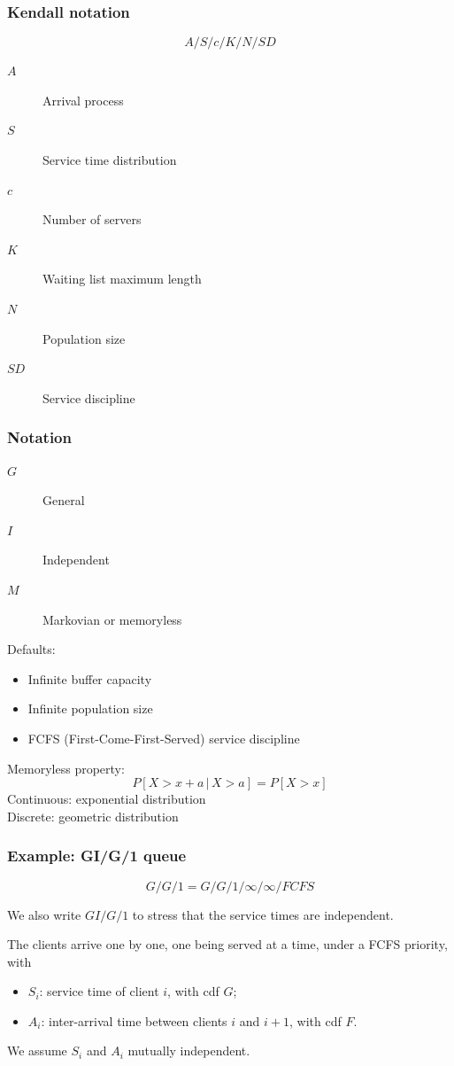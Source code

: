 \documentclass[t,usepdftitle=false]{beamer}
\begin{document}
\begin{frame}
\frametitle{Kendall notation}

$$
A/S/c/K/N/SD
$$

\mbox{}

\begin{description}
	\item[$A$]
Arrival process
	\item[$S$]
Service time distribution
	\item[$c$]
Number of servers
	\item[$K$]
Waiting list maximum length
	\item[$N$]
Population size
	\item[$SD$]
Service discipline
\end{description}
 
\end{frame}

\begin{frame}
\frametitle{Notation}

\begin{description}
	\item[$G$]
	General
	\item[$I$]
	Independent
	\item[$M$]
	Markovian or memoryless
\end{description}

\mbox{}

Defaults:
\begin{itemize}
	\item
	Infinite buffer capacity
	\item
	Infinite population size
	\item
	FCFS (First-Come-First-Served) service discipline
\end{itemize}

\mbox{}

Memoryless property:
$$
P[X > x +a \,|\, X > a] = P[X > x]
$$
Continuous: exponential distribution\\
Discrete: geometric distribution 

\end{frame}

\begin{frame}
\frametitle{Example: GI/G/1 queue}

$$
G/G/1 = G/G/1/\infty/\infty/FCFS
$$

We also write $GI/G/1$ to stress that the service times are independent.

\mbox{}

The clients arrive one by one, one being served at a time, under a FCFS priority, with
\begin{itemize}
\item
${S_i}$: service time of client $i$, with cdf $G$;
\item
${A_i}$: inter-arrival time between clients $i$ and $i+1$, with cdf $F$.
\end{itemize}
We assume $S_i$ and $A_i$ mutually independent.

\end{frame}
\end{document}
